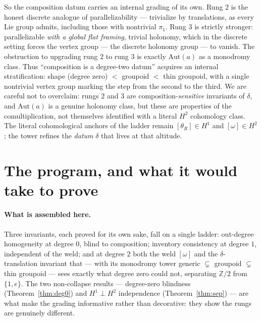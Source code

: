 \documentclass[11pt]{article}
\theoremstyle{definition}
\newcommand{\Aut}{\mathrm{Aut}}
\newcommand{\Z}{\mathbb{Z}}
\begin{document}
So the composition datum carries an internal grading of its own. Rung $2$ is the honest discrete
analogue of parallelizability --- trivialize by translations, as every Lie group admits, including
those with nontrivial $\pi_1$. Rung $3$ is strictly stronger: parallelizable \emph{with a global
flat framing}, trivial holonomy, which in the discrete setting forces the vertex group --- the
discrete holonomy group --- to vanish. The obstruction to upgrading rung $2$ to rung $3$ is exactly
$\Aut(a)$ as a monodromy class. Thus ``composition is a degree-two datum'' acquires an internal
stratification: shape (degree zero) $<$ groupoid $<$ thin groupoid, with a single nontrivial vertex
group marking the step from the second to the third. We are careful not to overclaim: rungs $2$ and
$3$ are composition-\emph{sensitive} invariants of $\delta$, and $\Aut(a)$ is a genuine holonomy
class, but these are properties of the comultiplication, not themselves identified with a literal
$H^2$ cohomology class. The literal cohomological anchors of the ladder remain
$[\theta_R]\in H^1$ and $[\omega]\in H^2$; the tower refines the \emph{datum} $\delta$ that lives at
that altitude.

\section{The program, and what it would take to prove}\label{sec:conclusion}

\paragraph{What is assembled here.}
Three invariants, each proved for its own sake, fall on a single ladder: out-degree homogeneity at
degree $0$, blind to composition; inventory consistency at degree $1$, independent of the weld; and
at degree $2$ both the weld $[\omega]$ and the $\delta$-translation invariant that --- with its
monodromy tower generic $\subsetneq$ groupoid $\subsetneq$ thin groupoid --- sees exactly what
degree zero could not, separating $\Z/2$ from $\{1,e\}$. The two non-collapse results --- degree-zero
blindness (Theorem~\ref{thm:deg0}) and $H^1\perp H^2$ independence (Theorem~\ref{thm:sep}) --- are
what make the grading informative rather than decorative: they show the rungs are genuinely
different.
\end{document}
